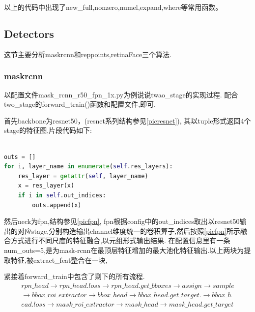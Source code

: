 \documentclass[UTF8]{ctexart}
\begin{document}
以上的代码中出现了new\_full,nonzero,numel,expand,where等常用函数。


\subsection{Detectors}
这节主要分析maskrcnn和reppoints,retinaFace三个算法.

\subsubsection{maskrcnn}
\label{maskrcnn}
以配置文件mask\_rcnn\_r50\_fpn\_1x.py为例说说twao\_stage的实现过程.
配合two\_stage的forward\_train()函数和配置文件,即可.

首先backbone为resnet50，(resnet系列结构参见\ref{picresnet}),
其以tuple形式返回4个stage的特征图,片段代码如下:
\lstset{style=mystyle}
\begin{lstlisting}[language=Python]

outs = []
for i, layer_name in enumerate(self.res_layers):
	res_layer = getattr(self, layer_name)
	x = res_layer(x)
	if i in self.out_indices:
		outs.append(x)

\end{lstlisting}

然后neck为fpn,结构参见\ref{picfpn},
fpn根据config中的out\_indices取出以resnet50输出的对应stage,分别构造输出channel维度统一的卷积算子,然后按照\ref{picfpn}所示融合方式进行不同尺度的特征融合,以元组形式输出结果.
在配置信息里有一条num\_outs=5,是为mask-rcnn在最顶层特征增加的最大池化特征输出.以上两块为提取特征,被extract\_feat整合在一块,



紧接着forward\_train中包含了剩下的所有流程.
\begin{equation*}
	\begin{aligned}
		 rpn\_head \rightarrow rpn\_head.loss \rightarrow rpn\_head.get\_bboxes \rightarrow assign \rightarrow sample \\
		\rightarrow bbox\_roi\_extractor \rightarrow  bbox\_head \rightarrow bbox\_head.get\_target. \rightarrow bbox\_h\\
		ead.loss \rightarrow mask\_roi\_extractor \rightarrow mask\_head \rightarrow mask\_head.get\_target
	\end{aligned}
\end{equation*} 
\end{document}
